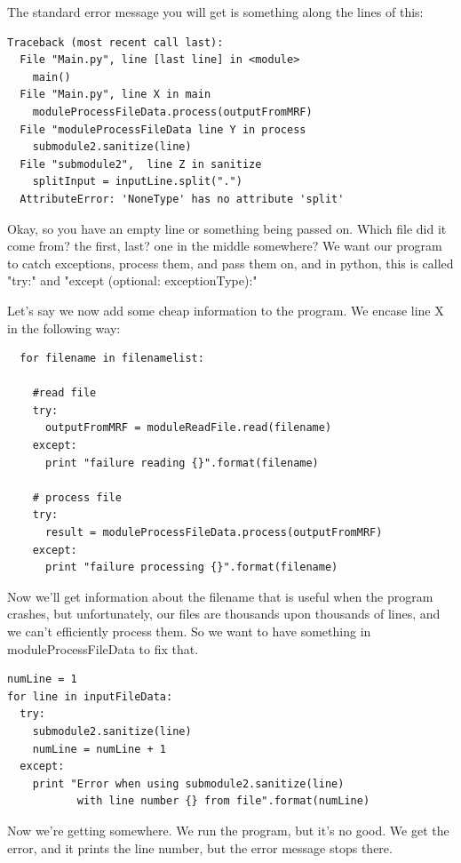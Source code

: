 \documentclass[10pt,a4paper]{article}
\begin{document}
The standard error message you will get is something along the lines of this: 

\begin{lstlisting}
Traceback (most recent call last):
  File "Main.py", line [last line] in <module>
    main()
  File "Main.py", line X in main    
    moduleProcessFileData.process(outputFromMRF)
  File "moduleProcessFileData line Y in process
    submodule2.sanitize(line)
  File "submodule2",  line Z in sanitize
    splitInput = inputLine.split(".")
  AttributeError: 'NoneType' has no attribute 'split'
\end{lstlisting}

Okay, so you have an empty line or something being passed on. Which file did it come from? the first, last? one in the middle somewhere? We want our program to catch exceptions, process them, and pass them on, and in python, this is called "try:" and "except (optional: exceptionType):"

Let's say we now add some cheap information to the program. We encase line X in the following way:

\begin{lstlisting}
  for filename in filenamelist:

    #read file
    try:
      outputFromMRF = moduleReadFile.read(filename)
    except:
      print "failure reading {}".format(filename)
      
    # process file
    try: 
      result = moduleProcessFileData.process(outputFromMRF)
    except: 
      print "failure processing {}".format(filename)
\end{lstlisting}

Now we'll get information about the filename that is useful when the program crashes, but unfortunately, our files are thousands upon thousands of lines, and we can't efficiently process them. So we want to have something in moduleProcessFileData to fix that.

\begin{lstlisting}
numLine = 1
for line in inputFileData:
  try: 
    submodule2.sanitize(line)
    numLine = numLine + 1
  except:
    print "Error when using submodule2.sanitize(line) 
           with line number {} from file".format(numLine)

\end{lstlisting}

Now we're getting somewhere. We run the program, but it's no good. We get the error, and it prints the line number, but the error message stops there.
\end{document}
